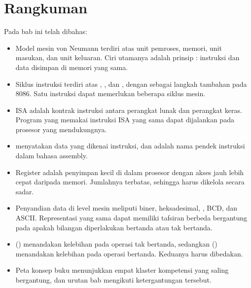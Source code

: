 \section{Rangkuman}
\label{sec:rangkuman-bab2}

Pada bab ini telah dibahas:

\begin{itemize}
    \item Model mesin von Neumann terdiri atas unit pemroses, memori,
          unit masukan, dan unit keluaran. Ciri utamanya adalah
          prinsip : instruksi dan data disimpan
          di memori yang sama.

    \item Siklus instruksi terdiri atas , ,
          dan , dengan  sebagai langkah
          tambahan pada 8086. Satu instruksi dapat memerlukan
          beberapa siklus mesin.

    \item ISA adalah kontrak instruksi antara perangkat lunak dan
          perangkat keras. Program yang memakai instruksi ISA yang
          sama dapat dijalankan pada prosesor yang mendukungnya.

    \item {} menyatakan data yang dikenai instruksi, dan
           adalah nama pendek instruksi dalam bahasa
          assembly.

    \item Register adalah penyimpan kecil di dalam prosesor dengan
          akses jauh lebih cepat daripada memori. Jumlahnya terbatas,
          sehingga harus dikelola secara sadar.

    \item Penyandian data di level mesin meliputi biner,
          heksadesimal, , BCD, dan ASCII.
          Representasi yang sama dapat memiliki tafsiran berbeda
          bergantung pada apakah bilangan diperlakukan bertanda atau
          tak bertanda.

    \item {} () menandakan kelebihan pada operasi
          tak bertanda, sedangkan  ()
          menandakan kelebihan pada operasi bertanda. Keduanya harus
          dibedakan.

    \item Peta konsep buku menunjukkan empat klaster kompetensi yang
          saling bergantung, dan urutan bab mengikuti
          ketergantungan tersebut.
\end{itemize}


